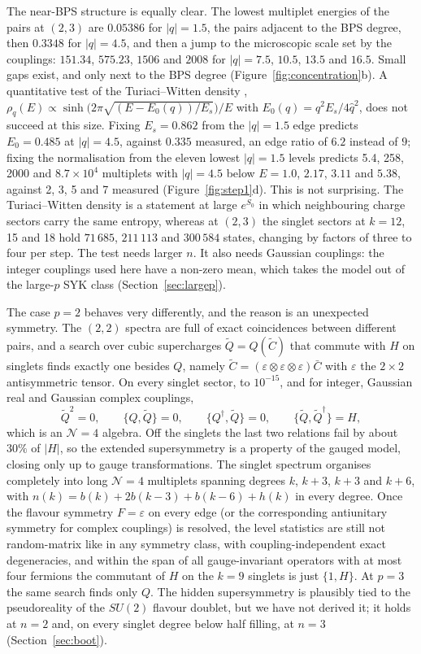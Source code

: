 \documentclass[10pt]{article}
\begin{document}
The near-BPS structure is equally clear. The lowest multiplet energies of the pairs at $(2,3)$ are $0.05386$ for
$|q|=1.5$, the pairs adjacent to the BPS degree, then $0.3348$ for $|q|=4.5$, and then a jump to the microscopic
scale set by the couplings: $151.34$, $575.23$, $1506$ and $2008$ for $|q|=7.5$, $10.5$, $13.5$ and $16.5$.
Small gaps exist, and only next to the BPS degree (Figure~\ref{fig:concentration}b). A quantitative test of the
Turiaci--Witten density \cite{TW}, $\rho_q(E)\propto\sinh\big(2\pi\sqrt{(E-E_0(q))/E_s}\big)/E$ with
$E_0(q)=q^2E_s/4\hat q^2$, does not succeed at this size. Fixing $E_s=0.862$ from the $|q|=1.5$ edge predicts
$E_0=0.485$ at $|q|=4.5$, against $0.335$ measured, an edge ratio of $6.2$ instead of $9$; fixing the normalisation
from the eleven lowest $|q|=1.5$ levels predicts 5.4, 258, 2000 and $8.7\times10^4$ multiplets with $|q|=4.5$ below
$E=1.0$, $2.17$, $3.11$ and $5.38$, against 2, 3, 5 and 7 measured (Figure~\ref{fig:step1}d). This is not
surprising. The Turiaci--Witten density is a statement at large $e^{S_0}$ in which neighbouring charge sectors carry
the same entropy, whereas at $(2,3)$ the singlet sectors at $k=12$, 15 and 18 hold $71\,685$, $211\,113$ and $300\,584$
states, changing by factors of three to four per step. The test needs larger $n$. It also needs Gaussian couplings:
the integer couplings used here have a non-zero mean, which takes the model out of the large-$p$ SYK class
(Section~\ref{sec:largep}).

The case $p=2$ behaves very differently, and the reason is an unexpected symmetry. The $(2,2)$ spectra are full of
exact coincidences between different pairs, and a search over cubic supercharges $\tilde Q=Q(\tilde C)$ that
commute with $H$ on singlets finds exactly one besides $Q$, namely
$\tilde C=(\varepsilon\otimes\varepsilon\otimes\varepsilon)\bar C$ with $\varepsilon$ the $2\times2$ antisymmetric
tensor. On every singlet sector, to $10^{-15}$, and for integer, Gaussian real and Gaussian complex couplings,
\begin{equation}
\tilde Q^2=0,\qquad\{Q,\tilde Q\}=0,\qquad\{Q^\dagger,\tilde Q\}=0,\qquad\{\tilde Q,\tilde Q^\dagger\}=H,
\end{equation}
which is an $\mathcal N=4$ algebra. Off the singlets the last two relations fail by about $30\%$ of $|H|$, so the
extended supersymmetry is a property of the gauged model, closing only up to gauge transformations. The singlet
spectrum organises completely into long $\mathcal N=4$ multiplets spanning degrees $k$, $k+3$, $k+3$ and $k+6$, with
$n(k)=b(k)+2b(k-3)+b(k-6)+h(k)$ in every degree. Once the flavour symmetry $F=\varepsilon$ on every edge (or the
corresponding antiunitary symmetry for complex couplings) is resolved, the level statistics are still not
random-matrix like in any symmetry class, with coupling-independent exact degeneracies, and within the span of all
gauge-invariant operators with at most four fermions the commutant of $H$ on the $k=9$ singlets is just $\{1,H\}$. At $p=3$ the
same search finds only $Q$. The hidden supersymmetry is plausibly tied to the pseudoreality of the $SU(2)$ flavour
doublet, but we have not derived it; it holds at $n=2$ and, on every singlet degree below half filling, at $n=3$
(Section~\ref{sec:boot}).
\end{document}
